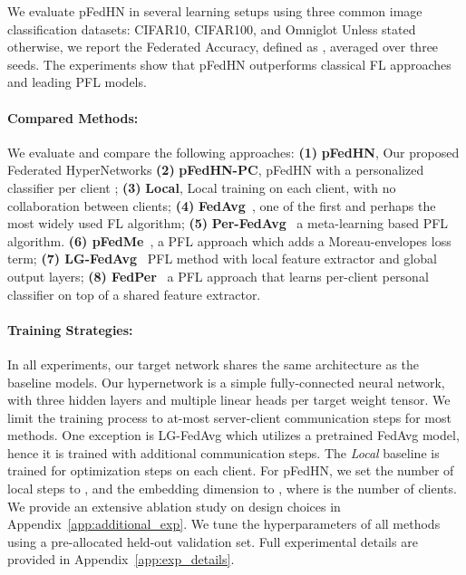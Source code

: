 \documentclass{article}
\newcommand\ourmethod{pFedHN}
\begin{document}
We evaluate \ourmethod{} in several learning setups using three common image classification datasets:  CIFAR10, CIFAR100, and Omniglot \citep{cifar, lake2015human} Unless stated otherwise, we report the Federated Accuracy, defined as   , averaged over three seeds.
The experiments show that \ourmethod{} outperforms classical FL approaches and leading PFL models. 


\paragraph{Compared Methods:} We evaluate and compare the following approaches: \textbf{(1)} \textbf{\ourmethod{}}, Our proposed Federated HyperNetworks  \textbf{(2)} \textbf{\ourmethod{}-PC}, \ourmethod{} with a personalized classifier per client ; 
\textbf{(3)} \textbf{Local}, Local training on each client, with no collaboration between clients;
\textbf{(4)} \textbf{FedAvg}~\cite{McMahan2017CommunicationEfficientLO}, one of the first and perhaps the most widely used FL algorithm;
\textbf{(5)} \textbf{Per-FedAvg}~\cite{Fallah2020PersonalizedFL} a meta-learning based PFL algorithm.
 \textbf{(6) pFedMe}~\cite{Dinh2020PersonalizedFL}, a PFL approach which adds a Moreau-envelopes loss term; \textbf{(7) LG-FedAvg}~\cite{liang2020think} PFL method with local feature extractor and global output layers; \textbf{(8) FedPer}~\cite{arivazhagan2019federated} a PFL approach that learns per-client personal classifier on top of a shared feature extractor.

\paragraph{Training Strategies:} In all experiments, our target network shares the same architecture as the baseline models. Our hypernetwork is a simple fully-connected neural network, with three hidden layers and multiple linear heads per target weight tensor. We limit the training process to at-most  server-client communication steps for most methods. One exception is LG-FedAvg which utilizes a pretrained FedAvg model, hence it is trained with additional  communication steps. The \textit{Local} baseline is trained for  optimization steps on each client. For \ourmethod{}, we set the number of local steps to , and the embedding dimension to , where  is the number of clients. We provide an extensive ablation study on design choices in Appendix~\ref{app:additional_exp}.
We tune the hyperparameters of all methods using a pre-allocated held-out validation set. Full experimental details are provided in Appendix~\ref{app:exp_details}.
\end{document}
